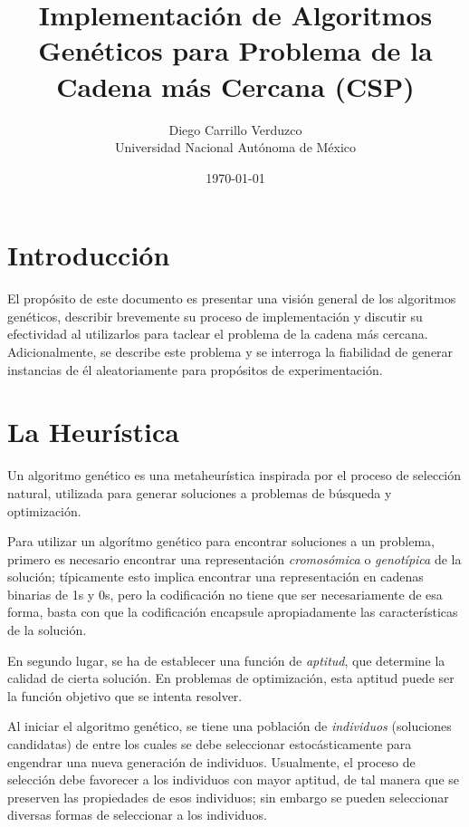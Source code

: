 \documentclass{article}
\title{Implementación de Algoritmos Genéticos para Problema de la Cadena más Cercana (CSP)}
\author{
  Diego Carrillo Verduzco \\
  Universidad Nacional Autónoma de México
}
\date{\today}
\begin{document}
\maketitle
\section{Introducción}
  El propósito de este documento es presentar una visión general de los algoritmos genéticos, describir
  brevemente su proceso de implementación y discutir su efectividad al utilizarlos para taclear el problema
  de la cadena más cercana. Adicionalmente, se describe este problema y se interroga la fiabilidad de 
  generar instancias de él aleatoriamente para propósitos de experimentación.

\section{La Heurística}
  Un algoritmo genético es una metaheurística inspirada por el proceso de selección natural, utilizada
  para generar soluciones a problemas de búsqueda y optimización.

  Para utilizar un algorítmo genético para encontrar soluciones a un problema, primero es necesario 
  encontrar una representación \textit{cromosómica} o \textit{genotípica} de la solución; típicamente
  esto implica encontrar una representación en cadenas binarias de 1s y 0s, pero la codificación no tiene
  que ser necesariamente de esa forma, basta con que la codificación encapsule apropiadamente las características 
  de la solución.
  
  En segundo lugar, se ha de establecer una función de \textit{aptitud}, que determine la calidad de cierta
  solución. En problemas de optimización, esta aptitud puede ser la función objetivo que se intenta resolver.

  Al iniciar el algoritmo genético, se tiene una población de \textit{individuos} (soluciones candidatas)
  de entre los cuales se debe seleccionar estocásticamente para engendrar una nueva generación de individuos.
  Usualmente, el proceso de selección debe favorecer a los individuos con mayor aptitud, de tal manera que se
  preserven las propiedades de esos individuos; sin embargo se pueden seleccionar diversas formas de seleccionar 
  a los individuos.
\end{document}
